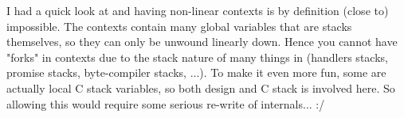 I had a quick look at \R{} and having non-linear contexts is by definition (close to) impossible. The contexts contain many global variables that are stacks themselves, so they can only be unwound linearly down. Hence you cannot have "forks" in contexts due to the stack nature of many things in \R{} (handlers stacks, promise stacks, byte-compiler stacks, ...). To make it even more fun, some are actually local C stack variables, so both \R{} design and C stack is involved here. So allowing this would require some serious re-write of \R{} internals... :/
